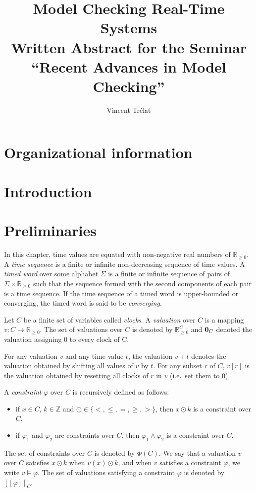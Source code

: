 \documentclass[11pt]{article}
\title{Model Checking Real-Time Systems\\\small Written Abstract for the Seminar ``Recent Advances in Model Checking''}
\author{Vincent Trélat}
\date{}
\theoremstyle{definition}
\theoremstyle{remark}
\begin{document}
\maketitle	

\section*{Organizational information}

\section{Introduction}\label{sec:intro}

\section{Preliminaries}\label{sec:prelims}
In this chapter, time values are equated with non-negative real numbers of $\mathbb{R}_{\geq 0}$. A \emph{time sequence} is a finite or infinite non-decreasing sequence of time values. A \emph{timed word} over some alphabet $\Sigma$ is a finite or infinite sequence of pairs of $\Sigma \times \mathbb{R}_{\geq 0}$ such that the sequence formed with the second components of each pair is a time sequence. If the time sequence of a timed word is upper-bounded or converging, the timed word is said to be \emph{converging}.

Let $C$ be a finite set of variables called \emph{clocks}. A \emph{valuation} over $C$ is a mapping $v \colon C \to \mathbb{R}_{\geq 0}$. The set of valuations over $C$ is denoted by $\mathbb{R}_{\geq 0}^C$ and $\text{\bf 0}_C$ denoted the valuation assigning 0 to every clock of C.

For any valuation $v$ and any time value $t$, the valuation $v + t$ denotes the valuation obtained by shifting all values of $v$ by $t$. For any subset $r$ of $C$, $v[r]$ is the valuation obtained by resetting all clocks of $r$ in $v$ (i.e.\ set them to 0).

A \emph{constraint} $\varphi$ over $C$ is recursively defined as follows:
\begin{itemize}
\item if $x \in C$, $k \in \mathbb{Z}$ and $\odot \in \{<, \leq, =, \geq, >\}$, then $x \odot k$ is a constraint over $C$,
\item if $\varphi_1$ and $\varphi_2$ are constraints over $C$, then $\varphi_1 \land \varphi_2$ is a constraint over $C$.
\end{itemize}
The set of constraints over $C$ is denoted by $\Phi(C)$.
We say that a valuation $v$ over $C$ satisfies $x \odot k$ when $v(x) \odot k$, and when $v$ satisfies a constraint $\varphi$, we write $v \models \varphi$. The set of valuations satisfying a constraint $\varphi$ is denoted by $[\![\varphi]\!]_C$.
\end{document}
